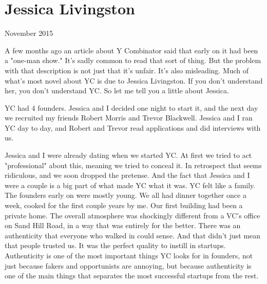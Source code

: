 \chapter{Jessica Livingston}


            
              
                

November 2015

A few months ago an article about Y
                  Combinator said that early on it had been a "one-man show."
                  It's sadly common to read that sort of thing. But the problem
                  with that description is not just that it's unfair. It's also
                  misleading. Much of what's most novel about YC is due to
                  Jessica Livingston. If you don't understand her, you don't
                  understand YC. So let me tell you a little about Jessica.

YC
                  had 4 founders. Jessica and I decided one night to start it,
                  and the next day we recruited my friends Robert Morris and
                  Trevor Blackwell. Jessica and I ran YC day to day, and Robert
                  and Trevor read applications and did interviews with us.

Jessica
                  and I were already dating when we started YC. At first we
                  tried to act "professional" about this, meaning we tried to
                  conceal it. In retrospect that seems ridiculous, and we soon
                  dropped the pretense. And the fact that Jessica and I were a
                  couple is a big part of what made YC what it was. YC felt like
                  a family. The founders early on were mostly young. We all had
                  dinner together once a week, cooked for the first couple years
                  by me. Our first building had been a private home. The overall
                  atmosphere was shockingly different from a VC's office on Sand
                  Hill Road, in a way that was entirely for the better. There
                  was an authenticity that everyone who walked in could sense.
                  And that didn't just mean that people trusted us. It was the
                  perfect quality to instill in startups. Authenticity is one of
                  the most important things YC looks for in founders, not just
                  because fakers and opportunists are annoying, but because
                  authenticity is one of the main things that separates the most
                  successful startups from the rest.

